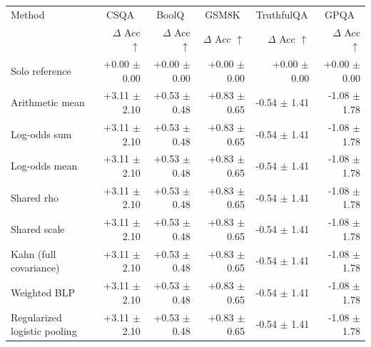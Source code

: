 \begin{tabular}{lrrrrr}
\toprule
Method & \multicolumn{1}{c}{CSQA} & \multicolumn{1}{c}{BoolQ} & \multicolumn{1}{c}{GSM8K} & \multicolumn{1}{c}{TruthfulQA} & \multicolumn{1}{c}{GPQA} \\
 & $\Delta$ Acc $\uparrow$ & $\Delta$ Acc $\uparrow$ & $\Delta$ Acc $\uparrow$ & $\Delta$ Acc $\uparrow$ & $\Delta$ Acc $\uparrow$ \\
\midrule
Solo reference & +0.00 {\scriptsize $\pm$ 0.00} & +0.00 {\scriptsize $\pm$ 0.00} & +0.00 {\scriptsize $\pm$ 0.00} & +0.00 {\scriptsize $\pm$ 0.00} & +0.00 {\scriptsize $\pm$ 0.00} \\
Arithmetic mean & +3.11 {\scriptsize $\pm$ 2.10} & +0.53 {\scriptsize $\pm$ 0.48} & +0.83 {\scriptsize $\pm$ 0.65} & -0.54 {\scriptsize $\pm$ 1.41} & -1.08 {\scriptsize $\pm$ 1.78} \\
Log-odds sum & +3.11 {\scriptsize $\pm$ 2.10} & +0.53 {\scriptsize $\pm$ 0.48} & +0.83 {\scriptsize $\pm$ 0.65} & -0.54 {\scriptsize $\pm$ 1.41} & -1.08 {\scriptsize $\pm$ 1.78} \\
Log-odds mean & +3.11 {\scriptsize $\pm$ 2.10} & +0.53 {\scriptsize $\pm$ 0.48} & +0.83 {\scriptsize $\pm$ 0.65} & -0.54 {\scriptsize $\pm$ 1.41} & -1.08 {\scriptsize $\pm$ 1.78} \\
Shared rho & +3.11 {\scriptsize $\pm$ 2.10} & +0.53 {\scriptsize $\pm$ 0.48} & +0.83 {\scriptsize $\pm$ 0.65} & -0.54 {\scriptsize $\pm$ 1.41} & -1.08 {\scriptsize $\pm$ 1.78} \\
Shared scale & +3.11 {\scriptsize $\pm$ 2.10} & +0.53 {\scriptsize $\pm$ 0.48} & +0.83 {\scriptsize $\pm$ 0.65} & -0.54 {\scriptsize $\pm$ 1.41} & -1.08 {\scriptsize $\pm$ 1.78} \\
Kahn (full covariance) & +3.11 {\scriptsize $\pm$ 2.10} & +0.53 {\scriptsize $\pm$ 0.48} & +0.83 {\scriptsize $\pm$ 0.65} & -0.54 {\scriptsize $\pm$ 1.41} & -1.08 {\scriptsize $\pm$ 1.78} \\
Weighted BLP & +3.11 {\scriptsize $\pm$ 2.10} & +0.53 {\scriptsize $\pm$ 0.48} & +0.83 {\scriptsize $\pm$ 0.65} & -0.54 {\scriptsize $\pm$ 1.41} & -1.08 {\scriptsize $\pm$ 1.78} \\
Regularized logistic pooling & +3.11 {\scriptsize $\pm$ 2.10} & +0.53 {\scriptsize $\pm$ 0.48} & +0.83 {\scriptsize $\pm$ 0.65} & -0.54 {\scriptsize $\pm$ 1.41} & -1.08 {\scriptsize $\pm$ 1.78} \\

\end{tabular}
